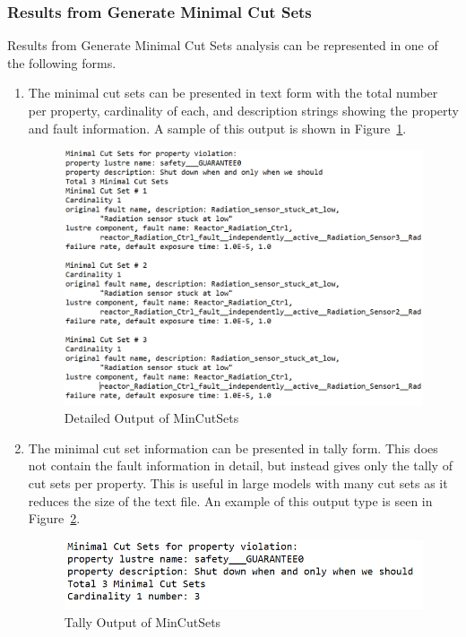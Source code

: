 \subsubsection{Results from Generate Minimal Cut Sets}
Results from Generate Minimal Cut Sets analysis can be represented in one of the following forms.
\begin{enumerate}
\item The minimal cut sets can be presented in text form with the total number per property, cardinality of each, and description strings showing the property and fault information. A sample of this output is shown in Figure~\ref{fig:detailedMCS}. 
\begin{figure}[htbp]
	\hspace*{-2cm}
	\vspace{-0.1in} 
	\begin{center}
		\includegraphics[scale=0.7]{images/detailedMCS.png}
	\caption{Detailed Output of MinCutSets}
		\label{fig:detailedMCS}
	\end{center}
\end{figure}

\item The minimal cut set information can be presented in tally form. This does not contain the fault information in detail, but instead gives only the tally of cut sets per property. This is useful in large models with many cut sets as it reduces the size of the text file. An example of this output type is seen in Figure~\ref{fig:tallyMCS}.
\begin{figure}[htbp]
	\hspace*{-2cm}
	\vspace{-0.1in} 
	\begin{center}
		\includegraphics[scale=0.7]{images/TallyMCS.png}
	\caption{Tally Output of MinCutSets}
		\label{fig:tallyMCS}
	\end{center}
\end{figure}


\end{enumerate}
